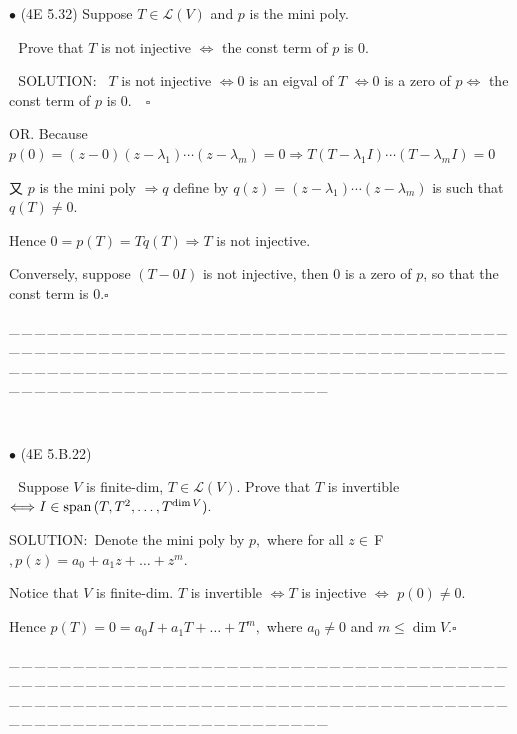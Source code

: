 \documentclass[a4paper, 11pt, UTF8]{article}
\def\Spn{\textup{span}\,}
\def\Lm{\mathcal{L}}
\def\Fbfc{$\,{\timesbf F}$}
\begin{document}
\begin{large}
{\small $\bullet$} (4E 5.32) {\timessl\Large Suppose $T\in\Lm(V)$ and $p$ is the mini poly.}\par\,\,
{\timessl\Large Prove that $T$ is not injective $\Longleftrightarrow$ the const term of $p$ is $0.$}\par\,\,
{\timesbf S\footnotesize{OLUTION:}}\,\,\,
$T$ is not injective $\Longleftrightarrow 0$ is an eigval of $T$ $\Longleftrightarrow 0$ is a zero of $p \Longleftrightarrow$ the const term of $p$ is $0.\quad\square$\par\quad
O{\small R.} Because $p(0)=(z-0)(z-\lambda_1)\cdots(z-\lambda_m)=0\Rightarrow T(T-\lambda_1 I)\cdots(T-\lambda_m I)=0$\par\quad
又 $p$ is the mini poly $\Rightarrow q$ define by $q(z)=(z-\lambda_1)\cdots(z-\lambda_m)$ is such that $q(T)\neq 0.$\par\quad
Hence $0=p(T)=Tq(T)\Rightarrow T$ is not injective.\par\quad
Conversely, suppose $(T-0I)$ is not injective, then $0$ is a zero of $p$, so that the const term is $0$.\quad$\square$\par
{\tiny \_\,\_\,\_\,\_\,\_\,\_\,\_\,\_\,\_\,\_\,\_\,\_\,\_\,\_\,\_\,\_\,\_\,\_\,\_\,\_\,\_\,\_\,\_\,\_\,\_\,\_\,\_\,\_\,\_\,\_\,\_\,\_\,\_\,\_\,\_\,\_\,\_\,\_\,\_\,\_\,\_\,\_\,\_\,\_\,\_\,\_\,\_\,\_\,\_\,\_\,\_\,\_\,\_\,\_\,\_\,\_\,\_\,\_\,\_\,\_\,\_\,\_\,\_\,\_\,\_\,\_\,\_\,\_\,\_\,\_\,\_\_\,\_\,\_\,\_\,\_\,\_\,\_\,\_\,\_\,\_\,\_\,\_\,\_\,\_\,\_\,\_\,\_\,\_\,\_\,\_\,\_\,\_\,\_\,\_\,\_\,\_\,\_\,\_\,\_\,\_\,\_\,\_\,\_\,\_\,\_\,\_\,\_\,\_\,\_\,\_\,\_\,\_\,\_\,\_\,\_\,\_\,\_\,\_\,\_\,\_\,\_\,\_\,\_\,\_\,\_\,\_\,\_\,\_\,\_\,\_\,\_\,\_\,\_\,\_\,\_\,\_\,\_\,\_\,\_\,\_\,\_}{\tiny\,\par}

{\small $\bullet$} ({\normalsize 4E 5.B.22})\par\,\, {\timessl\Large 
Suppose $V$ is finite-dim, $T\in \Lm(V)$. Prove that $T$ is invertible $\Longleftrightarrow I\in\Spn(T, T^2, \dots , T^{\dim V}).$
}\par
{\timesbf S\footnotesize{OLUTION:}}\,\,\,Denote the mini poly by $p,$ where for all $z\in\Fbfc,p(z)=a_0 +a_1 z+\dots+z^m.$\par\quad
Notice that $V$ is finite-dim. $T$ is invertible $\Longleftrightarrow T$ is injective $\Longleftrightarrow$ $p(0)\neq 0$.\par\quad
Hence $p(T)=0=a_0 I+a_1 T+\dots+T^m,$ where $a_0\neq 0$ and $m\leq\dim V.$\quad$\square$\par
{\tiny \_\,\_\,\_\,\_\,\_\,\_\,\_\,\_\,\_\,\_\,\_\,\_\,\_\,\_\,\_\,\_\,\_\,\_\,\_\,\_\,\_\,\_\,\_\,\_\,\_\,\_\,\_\,\_\,\_\,\_\,\_\,\_\,\_\,\_\,\_\,\_\,\_\,\_\,\_\,\_\,\_\,\_\,\_\,\_\,\_\,\_\,\_\,\_\,\_\,\_\,\_\,\_\,\_\,\_\,\_\,\_\,\_\,\_\,\_\,\_\,\_\,\_\,\_\,\_\,\_\,\_\,\_\,\_\,\_\,\_\,\_\_\,\_\,\_\,\_\,\_\,\_\,\_\,\_\,\_\,\_\,\_\,\_\,\_\,\_\,\_\,\_\,\_\,\_\,\_\,\_\,\_\,\_\,\_\,\_\,\_\,\_\,\_\,\_\,\_\,\_\,\_\,\_\,\_\,\_\,\_\,\_\,\_\,\_\,\_\,\_\,\_\,\_\,\_\,\_\,\_\,\_\,\_\,\_\,\_\,\_\,\_\,\_\,\_\,\_\,\_\,\_\,\_\,\_\,\_\,\_\,\_\,\_\,\_\,\_\,\_\,\_\,\_\,\_\,\_\,\_\,\_}{\tiny\,\par}


\end{large}
\end{document}
